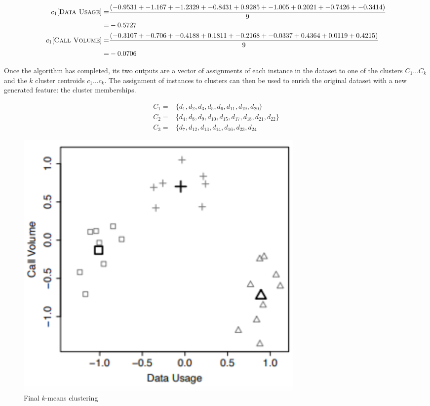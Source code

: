 \documentclass[a4paper,11pt]{article}
\begin{document}
\begin{align*}
    c_1[\textsc{Data Usage}] =& \frac{(-0.9531 + -1.167 + -1.2329 + -0.8431 + 0.9285 + -1.005 + 0.2021 + -0.7426 + -0.3414)}{9} \\
    =& -0.5727 \\
    c_1[\textsc{Call Volume}] =& \frac{(-0.3107 + -0.706 + -0.4188 + 0.1811 + -0.2168 + -0.0337 + 0.4364 + 0.0119 + 0.4215)}{9} \\
    =& -0.0706
\end{align*}

Once the algorithm has completed, its two outputs are a vector of assignments of each instance in the dataset to one of the clusters $C_1 \dots C_k$ and the $k$ cluster centroids $c_1 \dots c_k$.
The assignment of instances to clusters can then be used to enrich the original dataset with a new generated feature: the cluster memberships.

\begin{align*}
    C_1 =& \{ d_1, d_2, d_3, d_5, d_6, d_{11}, d_{19}, d_{20} \} \\
    C_2 =& \{ d_4, d_8, d_9, d_{10}, d_{15}, d_{17}, d_{18}, d_{21}, d_{22}\} \\
    C_3 =& \{ d_7, d_{12}, d_{13}, d_{14}, d_{16}, d_{23}, d_{24}
\end{align*}

\begin{figure}[H]
    \centering
    \includegraphics[width=0.7\textwidth]{images/mobilephonecustomerfinal.png}
    \caption{ Final $k$-means clustering }
\end{figure}
\end{document}
